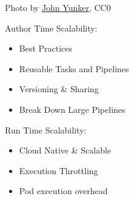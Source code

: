 \documentclass[aspectratio=169,11pt,hyperref={colorlinks=true}]{beamer}
\begin{document}
\begin{lpicrblack}{%
  Photo by \href{https://unsplash.com/@jyunker}{\underline{John Yunker}}, CC0
  }%
  {%
    Author Time Scalability:
    \begin{itemize}
      \item Best Practices
      \item Reusable Tasks and Pipelines
      \item Versioning \& Sharing
      \item Break Down Large Pipelines
     \end{itemize}
    \vspace{0.1\paperheight}
    Run Time Scalability:
    \begin{itemize}
      \item Cloud Native \& Scalable
      \item Execution Throttling
      \item Pod execution overhead
    \end{itemize}
    \vspace{0.01\paperheight}
  }{}%
  \frametitle{}
\end{lpicrblack}
\end{document}
